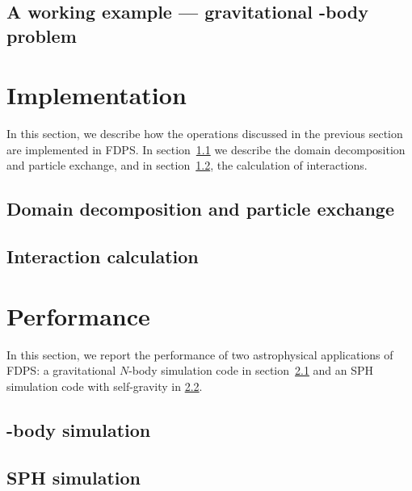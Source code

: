 \documentclass{acm_proc_article-sp}
\begin{document}


\subsection{A working example --- gravitational -body problem}
\label{sec:samplecode}



\section{Implementation}
\label{sec:implementation}

In this section, we describe how the operations discussed in the
previous section are implemented in FDPS. In
section~\ref{sec:decomposition} we describe the domain decomposition
and particle exchange, and in section~\ref{sec:calculation}, the
calculation of interactions.

\subsection{Domain decomposition and particle exchange}
\label{sec:decomposition}



\subsection{Interaction calculation}
\label{sec:calculation}



\section{Performance}
\label{sec:performance}

In this section, we report the performance of two astrophysical
applications of FDPS: a gravitational $N$-body simulation code in
section~\ref{sec:nbody} and an SPH simulation code with self-gravity
in \ref{sec:sph}.


\subsection{-body simulation}
\label{sec:nbody}



\subsection{SPH simulation}
\label{sec:sph}
\end{document}
